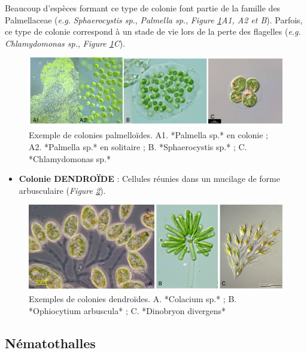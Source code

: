 \documentclass[
]{book}
\providecommand{\tightlist}{%
  \setlength{\itemsep}{0pt}\setlength{\parskip}{0pt}}
\begin{document}
Beaucoup d'espèces formant ce type de colonie font partie de la famille des Palmellaceae (\emph{e.g.} \emph{Sphaerocystis sp.}, \emph{Palmella sp.}, \emph{Figure \ref{fig:palmell}A1, A2 et B}). Parfois, ce type de colonie correspond à un stade de vie lors de la perte des flagelles (\emph{e.g.} \emph{Chlamydomonas sp.}, \emph{Figure \ref{fig:palmell}C}).

\begin{figure}[H]

{\centering \includegraphics[width=0.7\linewidth]{./images/palmell} 

}

\caption{Exemple de colonies palmelloïdes. A1. *Palmella sp.* en colonie ; A2. *Palmella sp.* en solitaire ; B. *Sphaerocystis sp.* ; C. *Chlamydomonas sp.*}\label{fig:palmell}
\end{figure}

\begin{itemize}
\tightlist
\item
  \textbf{Colonie DENDROÏDE} : Cellules réunies dans un mucilage de forme arbusculaire (\emph{Figure \ref{fig:dendroide}}).
\end{itemize}

\begin{figure}[H]

{\centering \includegraphics[width=0.7\linewidth]{./images/dendroide} 

}

\caption{Exemples de colonies dendroïdes. A. *Colacium  sp.* ; B. *Ophiocytium arbuscula* ; C. *Dinobryon divergens*}\label{fig:dendroide}
\end{figure}

\hypertarget{nuxe9matothalles}{%
\subsection{Nématothalles}\label{nuxe9matothalles}}
\end{document}
